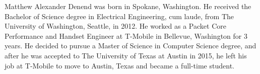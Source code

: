 \documentclass[12pt]{report}	%
\begin{document}

\begin{vita}
Matthew Alexander Denend was born in Spokane, Washington. He received the Bachelor of Science degree in Electrical Engineering, cum laude, from The University of Washington, Seattle, in 2012. He worked as a Packet Core Performance and Handset Engineer at T-Mobile in Bellevue, Washington for 3 years. He decided to pursue a Master of Science in Computer Science degree, and after he was accepted to The University of Texas at Austin in 2015, he left his job at T-Mobile to move to Austin, Texas and became a full-time student.
\end{vita}
\end{document}
